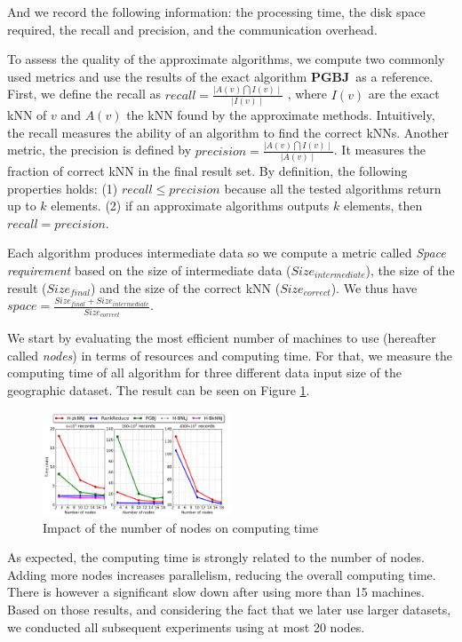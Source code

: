 \documentclass[10pt,journal,compsoc]{IEEEtran}
\newcommand{\VO}{{\bf PGBJ}}
\begin{document}
And we record the following information: the processing time, the disk space required, the recall and precision, and the communication overhead.

To assess the quality of the approximate algorithms, we compute two commonly used metrics and use the results of 
the exact algorithm \VO~as a reference. First, we define the recall as $ recall = \frac{\mid A(v) \bigcap I(v) 
\mid}{\mid  
I(v) \mid}$%
, where  $I(v)$ are the exact kNN of $v$ and $A(v)$ the kNN found 
by the approximate methods. Intuitively, the recall measures the ability of an algorithm to find the correct kNNs.
Another metric, the precision is defined by $precision =  \frac{\mid A(v) \bigcap I(v) \mid}{\mid  
A(v) \mid}$. It measures the fraction of correct kNN in the
final result set. By definition, the following properties holds: (1) $recall \leq precision$ because all the tested 
algorithms return up to $k$ elements. (2) if an approximate algorithms outputs $k$ elements, 
then  $ recall = precision$. 

Each algorithm produces intermediate data so we compute a metric called \emph{Space requirement} based on the size of
intermediate data ($Size_{intermediate}$), the size of the result ($Size_{final}$) and the size of the correct kNN 
($Size_{correct}$). We thus have $space = \frac{Size_{final}+Size_{intermediate}}{Size_{correct}}$.


We start by evaluating the most efficient number of machines to use (hereafter called \emph{nodes}) in terms of resources and computing 
time. For that, we measure the computing time of all algorithm for three different data input size of the geographic dataset.
The result can be seen on Figure \ref{fig:geo_data_nodes}.
\begin{figure}[!h]
 \centering
 \includegraphics[width=0.5\textwidth]{nodes.pdf}
 \caption{Impact of the number of nodes on computing time  \label{fig:geo_data_nodes}}
\end{figure}
As expected, the computing time is strongly related to the number of nodes. Adding more nodes increases parallelism, reducing the
overall computing time. There is however a significant slow down after using more than 15 machines. Based on those
results, and considering the fact that we later use larger datasets, we conducted all subsequent experiments using at 
most 20 nodes.
\end{document}
